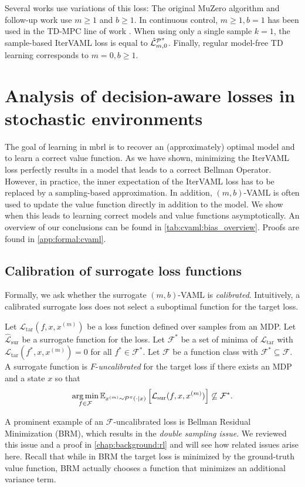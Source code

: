 Several works use variations of this loss:
The original MuZero algorithm \parencite{schrittwieser2020mastering} and follow-up work \parencite{ye2021mastering,antonoglou2022planning} use $m\geq1$ and $b\geq1$.
In continuous control, $m\geq1,b=1$ has been used in the TD-MPC line of work \parencite{hansen2022temporal,hansen2024tdmpc}.
When using only a single sample $k=1$, the sample-based IterVAML loss is equal to $\hat{\mathcal{L}}^{\P^\pi}_{m,0}$.
Finally, regular model-free TD learning corresponds to $m=0,b\geq1$.


\section{Analysis of decision-aware losses in stochastic environments}
\label{sec:cvaml:theory_1}
The goal of learning in \ac{mbrl} is to recover an (approximately) optimal model and to learn a correct value function.
As we have shown, minimizing the IterVAML loss perfectly results in a model that leads to a correct Bellman Operator.
However, in practice, the inner expectation of the IterVAML loss has to be replaced by a sampling-based approximation.
In addition, $(m,b)$-VAML is often used to update the value function directly in addition to the model.
We show when this leads to learning correct models and value functions asymptotically.
An overview of our conclusions can be found in \autoref{tab:cvaml:bias_overview}.
Proofs are found in \autoref{app:formal:cvaml}.
\subsection{Calibration of surrogate loss functions}

Formally, we ask whether the surrogate $(m,b)$-VAML is \emph{calibrated}.
Intuitively, a calibrated surrogate loss does not select a suboptimal function for the target loss.
\begin{definition}
    Let $\mathcal{L}_\mathrm{tar}(f,x,x^{(m)})$ be a loss function defined over samples from an MDP.
    Let $\hat{\mathcal{L}}_\mathrm{sur}$ be a surrogate function for the loss.
    Let $\mathcal{F}^*$ be a set of minima of $\mathcal{L}_\mathrm{tar}$ with $\mathcal{L}_\mathrm{tar}(f^*,x,x^{(m)}) = 0$ for all $f^* \in \mathcal{F}^*.$
    Let $\mathcal{F}$ be a function class with $\mathcal{F}^* \subseteq \mathcal{F}$.
    A surrogate function is $F$-\emph{uncalibrated} for the target loss if there exists an MDP and a state $x$ so that 
    $$\argmin_{f \in \mathcal{F}} \mathbb{E}_{x^{(m)}\sim\P^\pi(\cdot|x)}\left[\mathcal{L}_\mathrm{sur}(f,x,x^{(m)})\right] \not\subseteq \mathcal{F}^*.$$
\end{definition}
A prominent example of an $\mathcal{F}$-uncalibrated loss is Bellman Residual Minimization (BRM), which results in the \emph{double sampling issue}.
We reviewed this issue and a proof in \autoref{chap:background:rl} and will see how related issues arise here.
Recall that while in BRM the target loss is minimized by the ground-truth value function, BRM actually chooses a function that minimizes an additional variance term.

